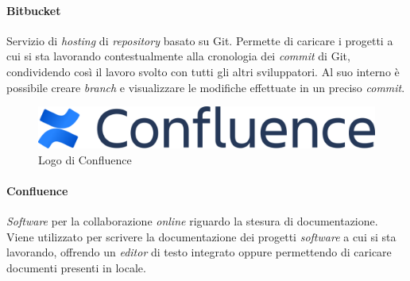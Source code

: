 \paragraph{Bitbucket} Servizio di \textit{hosting} di \textit{repository} basato su Git. Permette di caricare i progetti a cui si sta lavorando contestualmente alla cronologia dei \textit{commit} di Git, condividendo così il lavoro svolto con tutti gli altri sviluppatori. Al suo interno è possibile creare \textit{branch} e visualizzare le modifiche effettuate in un preciso \textit{commit}.

\vspace{6mm}

\begin{figure}[H]
    \centering 
    \includegraphics[width=0.4\columnwidth]{images/loghi/confluence.png} 
    \caption{Logo di Confluence}
\end{figure}

\paragraph{Confluence} \textit{Software} per la collaborazione \textit{online} riguardo la stesura di documentazione. Viene utilizzato per scrivere la documentazione dei progetti \textit{software} a cui si sta lavorando, offrendo un \textit{editor} di testo integrato oppure permettendo di caricare documenti presenti in locale.


